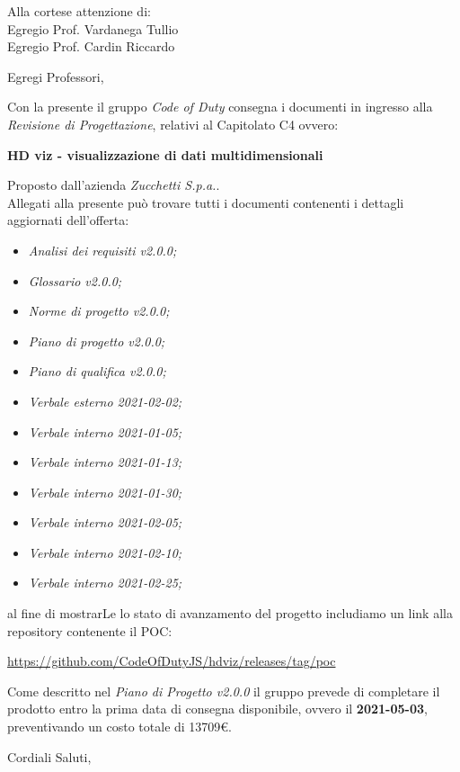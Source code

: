 \documentclass[11pt]{letter}
\begin{document}
\begin{letter}{Alla cortese attenzione di: \\ Egregio Prof. Vardanega Tullio \\ Egregio Prof. Cardin Riccardo}
\date{8 Gennaio, 2021}
\opening{Egregi Professori,}
Con la presente il gruppo \textit{Code of Duty} consegna i documenti in ingresso alla \textit{Revisione di Progettazione}, relativi al Capitolato C4 ovvero:
\begin{center}
    \textbf{HD viz -  visualizzazione di dati multidimensionali}
\end{center}
Proposto dall'azienda \textit{Zucchetti S.p.a.}.\\
Allegati alla presente può trovare tutti i documenti contenenti i dettagli aggiornati dell'offerta:
\begin{itemize}
    \item \textit{Analisi dei requisiti v2.0.0;}
    \item \textit{Glossario v2.0.0;}
    \item \textit{Norme di progetto v2.0.0;}
    \item \textit{Piano di progetto v2.0.0;}
    \item \textit{Piano di qualifica v2.0.0;}
    \item \textit{Verbale esterno 2021-02-02;}
    \item \textit{Verbale interno 2021-01-05;}
    \item \textit{Verbale interno 2021-01-13;}
    \item \textit{Verbale interno 2021-01-30;}
    \item \textit{Verbale interno 2021-02-05;}
    \item \textit{Verbale interno 2021-02-10;}
    \item \textit{Verbale interno 2021-02-25;}
\end{itemize}
al fine di mostrarLe lo stato di avanzamento del progetto includiamo un link alla repository contenente il POC:
\begin{center}
\url{https://github.com/CodeOfDutyJS/hdviz/releases/tag/poc}
\end{center}
Come descritto nel \textit{Piano di Progetto v2.0.0} il gruppo prevede di completare il prodotto entro la prima data di consegna disponibile, ovvero il \textbf{2021-05-03}, preventivando un costo totale di 13709€.
\closing{Cordiali Saluti,}
\end{letter}
\end{document}
